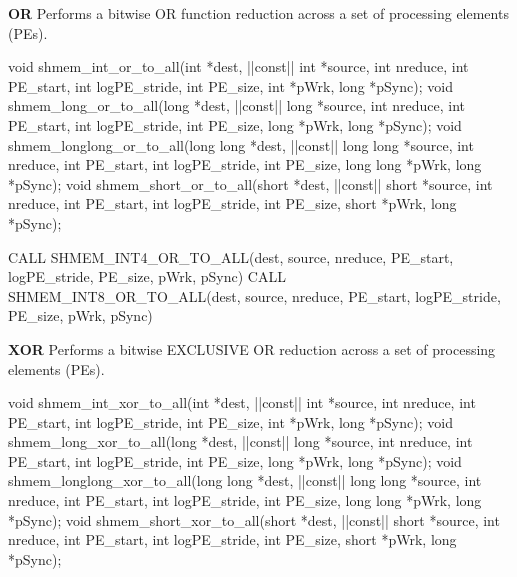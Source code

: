 \begin{apidefinition}
\bigskip
\textbf{OR} \newline
Performs  a  bitwise  OR  function reduction across a set of processing elements (\ac{PE}s).\newline
\begin{Csynopsis}
void shmem_int_or_to_all(int *dest, |\aftergroup{}|const|\aftergroup\prevcolor| int *source, int nreduce, int PE_start, int logPE_stride, int PE_size, int *pWrk, long *pSync);
void shmem_long_or_to_all(long *dest, |\aftergroup{}|const|\aftergroup\prevcolor| long *source, int nreduce, int PE_start, int logPE_stride, int PE_size, long *pWrk, long *pSync);
void shmem_longlong_or_to_all(long long *dest, |\aftergroup{}|const|\aftergroup\prevcolor| long long *source, int nreduce, int PE_start, int logPE_stride, int PE_size, long long *pWrk, long *pSync);
void shmem_short_or_to_all(short *dest, |\aftergroup{}|const|\aftergroup\prevcolor| short *source, int nreduce, int PE_start, int logPE_stride, int PE_size, short *pWrk, long *pSync);
\end{Csynopsis}

\begin{Fsynopsis}
CALL SHMEM_INT4_OR_TO_ALL(dest, source, nreduce, PE_start, logPE_stride, PE_size, pWrk, pSync)
CALL SHMEM_INT8_OR_TO_ALL(dest, source, nreduce, PE_start, logPE_stride, PE_size, pWrk, pSync)	
\end{Fsynopsis}

\bigskip
\textbf{XOR}\newline
Performs  a  bitwise  EXCLUSIVE OR reduction across a set of processing elements (\ac{PE}s).\newline
\begin{Csynopsis}
void shmem_int_xor_to_all(int *dest, |\aftergroup{}|const|\aftergroup\prevcolor| int *source, int nreduce, int PE_start, int logPE_stride, int PE_size, int *pWrk, long *pSync);
void shmem_long_xor_to_all(long *dest, |\aftergroup{}|const|\aftergroup\prevcolor| long *source, int nreduce, int PE_start, int logPE_stride, int PE_size, long *pWrk, long *pSync);
void shmem_longlong_xor_to_all(long long *dest, |\aftergroup{}|const|\aftergroup\prevcolor| long long *source, int nreduce, int PE_start, int logPE_stride, int PE_size, long long *pWrk, long *pSync);
void shmem_short_xor_to_all(short *dest, |\aftergroup{}|const|\aftergroup\prevcolor| short *source, int nreduce, int PE_start, int logPE_stride, int PE_size, short *pWrk, long *pSync);
\end{Csynopsis}


\end{apidefinition}
